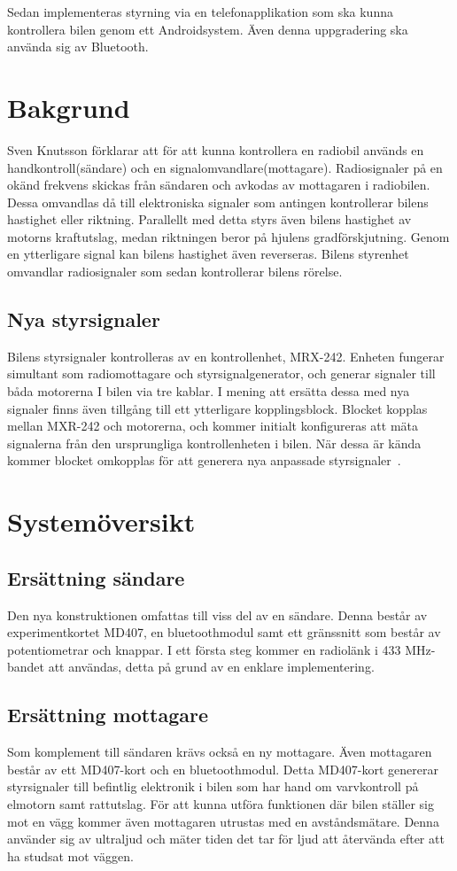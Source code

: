 \documentclass[a4paper]{article}
\begin{document}
Sedan implementeras styrning via en telefonapplikation som ska kunna kontrollera bilen genom ett Androidsystem. Även denna uppgradering ska använda sig av Bluetooth.


\section{Bakgrund}
Sven Knutsson förklarar att för att kunna kontrollera en radiobil används en handkontroll(sändare) och en signalomvandlare(mottagare). Radiosignaler på en okänd frekvens skickas från sändaren och avkodas av mottagaren i radiobilen. Dessa omvandlas då till elektroniska signaler som antingen kontrollerar bilens hastighet eller riktning. Parallellt med detta styrs även bilens hastighet av motorns kraftutslag, medan riktningen beror på hjulens gradförskjutning. Genom en ytterligare signal kan bilens hastighet även reverseras. Bilens styrenhet omvandlar radiosignaler som sedan kontrollerar bilens rörelse.

\subsection{Nya styrsignaler}
Bilens styrsignaler kontrolleras av en kontrollenhet, MRX-242. Enheten fungerar simultant som radiomottagare och styrsignalgenerator, och generar signaler till båda motorerna I bilen via tre kablar. I mening att ersätta dessa med nya signaler finns även tillgång till ett ytterligare kopplingsblock. Blocket kopplas mellan MXR-242 och motorerna, och kommer initialt konfigureras att mäta signalerna från den ursprungliga kontrollenheten i bilen. När dessa är kända kommer blocket omkopplas för att generera nya anpassade styrsignaler~\cite{projektDir}. 

\section{Systemöversikt}
\subsection{Ersättning sändare}
Den nya konstruktionen omfattas till viss del av en sändare. Denna består av experimentkortet MD407, en bluetoothmodul samt ett gränssnitt som består av potentiometrar och knappar. I ett första steg kommer en radiolänk i 433 MHz-bandet att användas, detta på grund av en enklare implementering.

\subsection{Ersättning mottagare}
Som komplement till sändaren krävs också en ny mottagare. Även mottagaren består av ett MD407-kort och en bluetoothmodul. Detta MD407-kort genererar styrsignaler till befintlig elektronik i bilen som har hand om varvkontroll på elmotorn samt rattutslag.
För att kunna utföra funktionen där bilen ställer sig mot en vägg kommer även mottagaren utrustas med en avståndsmätare. Denna använder sig av ultraljud och mäter tiden det tar för ljud att återvända efter att ha studsat mot väggen.
\end{document}
